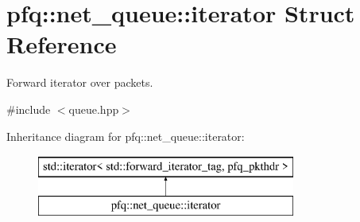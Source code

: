 \hypertarget{structpfq_1_1net__queue_1_1iterator}{}\section{pfq\+:\+:net\+\_\+queue\+:\+:iterator Struct Reference}
\label{structpfq_1_1net__queue_1_1iterator}


Forward iterator over packets.  




{\ttfamily \#include $<$queue.\+hpp$>$}

Inheritance diagram for pfq\+:\+:net\+\_\+queue\+:\+:iterator\+:\begin{figure}[H]
\begin{center}
\leavevmode
\includegraphics[height=2.000000cm]{structpfq_1_1net__queue_1_1iterator}
\end{center}
\end{figure}
